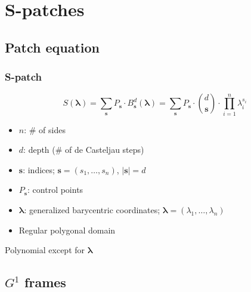 \documentclass[xcolor=table]{beamer}
\begin{document}

\section{S-patches}
\subsection{Patch equation}

\begin{frame}
  \frametitle{S-patch}
  \[
  S(\mathbf{\lambda})=\sum_{\mathbf{s}}P_\mathbf{s}\cdot B_\mathbf{s}^d(\mathbf{\lambda})
  =\sum_{\mathbf{s}}P_\mathbf{s}\cdot {d\choose\mathbf{s}}\cdot\prod_{i=1}^n\lambda_i^{s_i}
  \]
  \begin{itemize}
  \item $n$: \# of sides
  \item $d$: depth (\# of de Casteljau steps)
  \item $\mathbf{s}$: indices; $\mathbf{s}=(s_1,\dots,s_n)$, $|\mathbf{s}|=d$
  \item $P_\mathbf{s}$: control points
  \item $\mathbf{\lambda}$: generalized barycentric coordinates;
    $\mathbf{\lambda}=(\lambda_1,\dots,\lambda_n)$
  \item Regular polygonal domain
  \end{itemize}
  \vfill
  \centering
  Polynomial except for $\mathbf{\lambda}$
\end{frame}

\subsection{$G^1$ frames}
\end{document}
